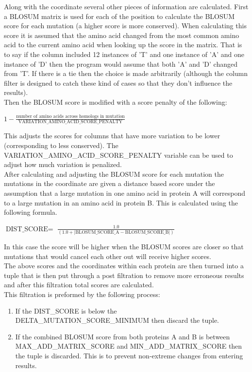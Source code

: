 \documentclass[11pt]{article}
\begin{document}
Along with the coordinate several other pieces of information are
calculated. First a BLOSUM matrix is used for each of the position to
calculate the BLOSUM score for each mutation (a higher score is more
conserved). When calculating this score it is assumed that the amino
acid changed from the most common amino acid to the current amino acid
when looking up the score in the matrix. That is to say if the column
included 12 instances of 'T' and one instance of 'A' and one instance
of 'D' then the program would assume that both 'A' and 'D' changed
from 'T'. If there is a tie then the choice is made arbitrarily
(although the column filter is designed to catch these kind of cases
so that they don't influence the results). \\

Then the BLOSUM score is modified with a score penalty of the
following:
\begin{center}
  $1 - \frac{\mbox{number of amino acids across homologs in mutation}}{\mbox{VARIATION\_AMINO\_ACID\_SCORE\_PENALTY}}$
\end{center}
This adjusts the scores for columns that have more variation to be
lower (corresponding to less conserved). The
VARIATION\_AMINO\_ACID\_SCORE\_PENALTY variable can be used to adjust
how much variation is penalized. \\

After calculating and adjusting the BLOSUM score for each mutation the
mutations in the coordinate are given a distance based score under the
assumption that a large mutation in one amino acid in protein A will
correspond to a large mutation in an amino acid in protein B. This is
calculated using the following formula. \\
\begin{center}
  $\mbox{DIST\_SCORE} = $
  $\frac{1.0}{(1.0 + |\mbox{BLOSUM\_SCORE\_A} - \mbox{BLOSUM\_SCORE\_B}|)}$
\end{center}
In this case the score will be higher when the BLOSUM scores are
closer so that mutations that would cancel each other out will receive
higher scores. \\

The above scores and the coordinates within each protein are then
turned into a tuple that is then put through a post filtration to
remove more erroneous results and after this filtration total scores
are calculated. \\

This filtration is preformed by the following process:
\begin{enumerate}
  \item If the DIST\_SCORE is below the
    DELTA\_MUTATION\_SCORE\_MINIMUM then discard the tuple.
  \item If the combined BLOSUM score from both proteins A and B is
    between MAX\_ADD\_MATRIX\_SCORE and MIN\_ADD\_MATRIX\_SCORE then
    the tuple is discarded. This is to prevent non-extreme changes
    from entering results.
\end{enumerate}
\end{document}
